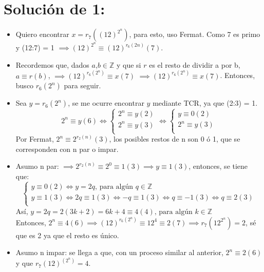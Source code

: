 \documentclass[12pt,twoside,a4paper]{exam}
\begin{document}
\section*{Solución de 1:}
\begin{itemize}
\item Quiero encontrar $x = r_7((12)^{2^n})$, para esto, uso Fermat. Como 7 es 
      primo y (12:7) = 1 $\implies (12)^{2^n} \equiv (12)^{r_6(2n)} (7).$
\item Recordemos que, dados $a$,$b \in \mathbb{Z}$ y que si $r$ es el resto de
      dividir a por b, $a \equiv r (b)$, $\implies (12)^{r_6(2^n)} \equiv x (7) $
      $\implies (12)^{r_6(2^n)} \equiv x (7)$. Entonces, busco $r_6(2^n)$ para 
      seguir.
\item Sea $y = r_6(2^n)$, se me ocurre encontrar $y$ mediante TCR, ya que (2:3) = 1.\\
 \[
     2^n \equiv y (6) \iff 
     \begin{cases}
        2^n \equiv y (2)\\
        2^n \equiv y (3)\\
     \end{cases}
     \iff
      \begin{cases}
        y \equiv 0 (2)\\
        2^n \equiv y (3)\\
     \end{cases}
\]
    Por Fermat, $2^n \equiv 2^{r_2(n)} (3)$, los posibles restos de n son 0 ó 1,
    que se corresponden con n par o impar.\\
\item Asumo n par: $\implies 2^{r_2(n)} \equiv 2^0 \equiv  1 (3) \implies y \equiv
    1 (3)$, entonces, se tiene que: 
\[
     \begin{cases}
     y \equiv 0 (2) \iff y=2q \text{, para algún } q \in \mathbb{Z} \\
     y \equiv 1 (3) \iff 2q \equiv 1 (3) \iff -q \equiv 1 (3) \iff q \equiv -1 (3)
     \iff q\equiv 2 (3)\\ 
     \end{cases}
\]
     Así, $y=2q=2(3k+2)=6k+4 \equiv 4 (4)\text{, para algún } k \in \mathbb{Z}$ \\
     Entonces, $2^n \equiv 4 (6) \implies (12)^{r_6(2^n)} \equiv 12^4 \equiv 2 (7) 
    \implies r_7(12^{2^n})=2$, sé que es 2 ya que el resto es único. 
\item Asumo n impar: se llega a que, con un proceso similar al anterior,  $2^n 
      \equiv 2 (6)$  y que $r_7(12)^{(2^n)}=4$.
\end{itemize}
\end{document}
